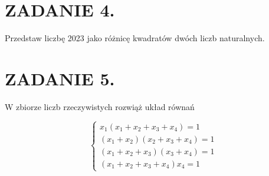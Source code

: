 \documentclass[10pt]{article}
\begin{document}
\section*{ZADANIE 4.}
Przedstaw liczbę 2023 jako różnicę kwadratów dwóch liczb naturalnych.

\section*{ZADANIE 5.}
W zbiorze liczb rzeczywistych rozwiąż układ równań

\[
\left\{\begin{array}{l}
x_{1}\left(x_{1}+x_{2}+x_{3}+x_{4}\right)=1 \\
\left(x_{1}+x_{2}\right)\left(x_{2}+x_{3}+x_{4}\right)=1 \\
\left(x_{1}+x_{2}+x_{3}\right)\left(x_{3}+x_{4}\right)=1 \\
\left(x_{1}+x_{2}+x_{3}+x_{4}\right) x_{4}=1
\end{array}\right.
\]
\end{document}
